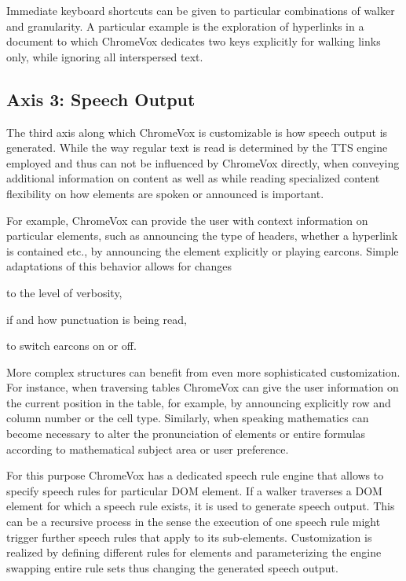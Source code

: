 \documentclass{sig-alternate}
\begin{document}
Immediate keyboard shortcuts can be given to particular combinations of walker
and granularity. A particular example is the exploration of hyperlinks in a
document to which ChromeVox dedicates two keys explicitly for walking links
only, while ignoring all interspersed text.

\subsection{Axis 3: Speech Output}
\label{sec:ax3}

The third axis along which ChromeVox is customizable is how speech output is
generated. While the way regular text is read is determined by the TTS engine
employed and thus can not be influenced by ChromeVox directly, when conveying
additional information on content as well as while reading specialized content
flexibility on how elements are spoken or announced is important.

For example, ChromeVox can provide the user with context information on
particular elements, such as announcing the type of headers, whether a hyperlink
is contained etc., by announcing the element explicitly or playing
earcons. Simple adaptations of this behavior allows for changes
\begin{inparaenum}[(a)]
\item to the level of verbosity,
\item if and how punctuation is being read,
\item to switch earcons on or off.
\end{inparaenum}

More complex structures can benefit from even more sophisticated customization.
For instance, when traversing tables ChromeVox can give the user information on
the current position in the table, for example, by announcing explicitly row and
column number or the cell type. Similarly, when speaking mathematics can become
necessary to alter the pronunciation of elements or entire formulas according to
mathematical subject area or user preference.

For this purpose ChromeVox has a dedicated speech rule engine that allows to
specify speech rules for particular DOM element. If a walker traverses a DOM
element for which a speech rule exists, it is used to generate speech
output. This can be a recursive process in the sense the execution of one speech
rule might trigger further speech rules that apply to its sub-elements.
Customization is realized by defining different rules for elements and
parameterizing the engine swapping entire rule sets thus changing the generated
speech output.
\end{document}
